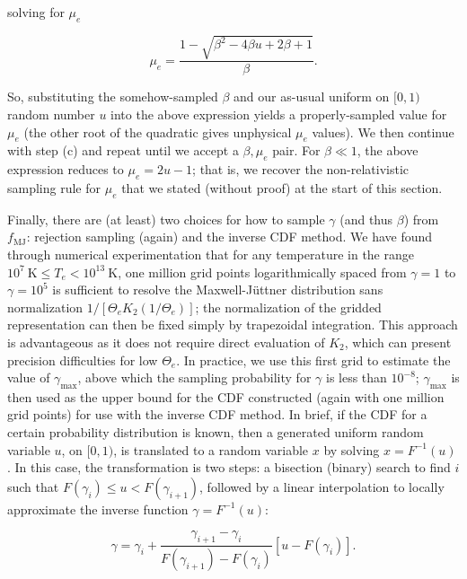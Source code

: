 \documentclass[letterpaper]{article}
\begin{document}
\begin{enumerate}
\noindent solving for $\mu_e$

\begin{equation}
\mu_e = \frac{1 - \sqrt{\beta^2 - 4 \beta u + 2 \beta + 1}}{\beta}.
\end{equation}

So, substituting the somehow-sampled $\beta$ and our as-usual uniform on $[0, 1)$ random number $u$ into the above expression yields a properly-sampled value for $\mu_e$ (the other root of the quadratic gives unphysical $\mu_e$ values). We then continue with step (c) and repeat until we accept a $\beta, \mu_e$ pair. For $\beta \ll 1$, the above expression reduces to $\mu_e = 2u - 1$; that is, we recover the non-relativistic sampling rule for $\mu_e$ that we stated (without proof) at the start of this section.

Finally, there are (at least) two choices for how to sample $\gamma$ (and thus $\beta$) from $f_\mathrm{MJ}$: rejection sampling (again) and the inverse CDF method. We have found through numerical experimentation that for any temperature in the range $10^7\ \mathrm{K} \leq T_e < 10^{13}\ \mathrm{K}$, one million grid points logarithmically spaced from $\gamma = 1$ to $\gamma = 10^5$ is sufficient to resolve the Maxwell-J\"{u}ttner distribution sans normalization $1/[\Theta_e K_2 (1/\Theta_e)]$; the normalization of the gridded representation can then be fixed simply by trapezoidal integration. This approach is advantageous as it does not require direct evaluation of $K_2$, which can present precision difficulties for low $\Theta_e$. In practice, we use this first grid to estimate the value of $\gamma_\mathrm{max}$, above which the sampling probability for $\gamma$ is less than $10^{-8}$; $\gamma_\mathrm{max}$ is then used as the upper bound for the CDF constructed (again with one million grid points) for use with the inverse CDF method. In brief, if the CDF for a certain probability distribution is known, then a generated uniform random variable $u$, on $[0, 1)$, is translated to a random variable $x$ by solving $x = F^{-1}(u)$. In this case, the transformation is two steps: a bisection (binary) search to find $i$ such that $F(\gamma_i) \leq u < F(\gamma_{i+1})$, followed by a linear interpolation to locally approximate the inverse function $\gamma = F^{-1}(u)$:

\begin{equation}
\gamma = \gamma_i + \frac{\gamma_{i+1} - \gamma_i}{F(\gamma_{i+1}) - F(\gamma_i)} [u - F(\gamma_i)].
\end{equation}


\end{enumerate}
\end{document}
